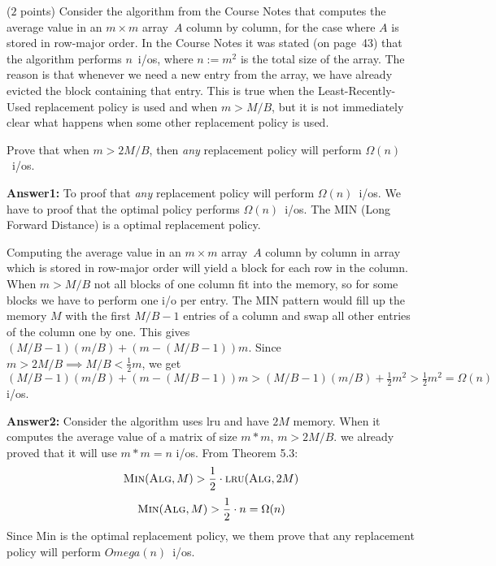 \documentclass{article}
\newcommand{\alg}{{\sc Alg}\xspace}
\newcommand{\io}{{\sc i/o}\xspace}
\newcommand{\ios}{{\io}s\xspace}
\newcommand{\lru}{{\sc lru}\xspace}
\newcounter{rcounter}
\newenvironment{rlist}%
{\begin{list}{\setnr-\arabic{rcounter}}{\usecounter{rcounter}}}{\end{list}}
\begin{document}
\begin{rlist}
\item ($2$ points)
    Consider the algorithm from the Course Notes that computes the average value in an $m\times m$ array~$A$ column by column, for the case where $A$ is stored in row-major order. In the Course Notes it was stated (on page~43) that the algorithm performs $n$~\ios, where $n := m^2$ is the total size of the array. The reason is that whenever we need a new entry from the array, we have already evicted the block containing that entry. This is true when the Least-Recently-Used replacement policy is used and when $m > M/B$, but it is not immediately clear what happens when some other replacement policy is used.
    
    Prove that when $m>2M/B$, then \emph{any} replacement policy will perform $\Omega(n)$~\ios.
    
    \textbf{Answer1:}
    To proof that \emph{any} replacement policy will perform $\Omega(n)$~\ios. We have to proof that the optimal policy performs $\Omega(n)$~\ios. The MIN (Long Forward Distance) is a optimal replacement policy.
    
    Computing the average value in an $m\times m$ array~$A$ column by column in array which is stored in row-major order will yield a block for each row in the column. When $m>M/B$ not all blocks of one column fit into the memory, so for some blocks we have to perform one \io per entry. The MIN pattern would fill up the memory $M$ with the first $M/B-1$ entries of a column and swap all other entries of the column one by one. This gives $(M/B-1)(m/B)+(m-(M/B-1))m$. Since $m>2M/B \implies M/B < \frac{1}{2}m$, we get $(M/B-1)(m/B)+(m-(M/B-1))m > (M/B-1)(m/B)+\frac{1}{2}m^2 > \frac{1}{2}m^2 = \Omega(n)$ \ios.
    
    \textbf{Answer2:}
    Consider the algorithm uses \lru and have $2M$ memory. When it computes the average value of a matrix of size $m*m$, $m>2M/B$. we already proved that it will use $m*m=n$ \ios.
    From Theorem 5.3:
    $$\textrm{\sc Min}(\textrm{\alg}, M) > \frac{1}{2} \cdot \textrm{\lru}(\textrm{\alg}, 2M)$$
    $$\textrm{\sc Min}(\textrm{\alg}, M) > \frac{1}{2} \cdot n = \Omega(n)$$
    Since {\sc Min} is the optimal replacement policy, we them prove that any replacement policy will perform $Omega(n)$~\ios.
        
    

\end{rlist}
\end{document}
